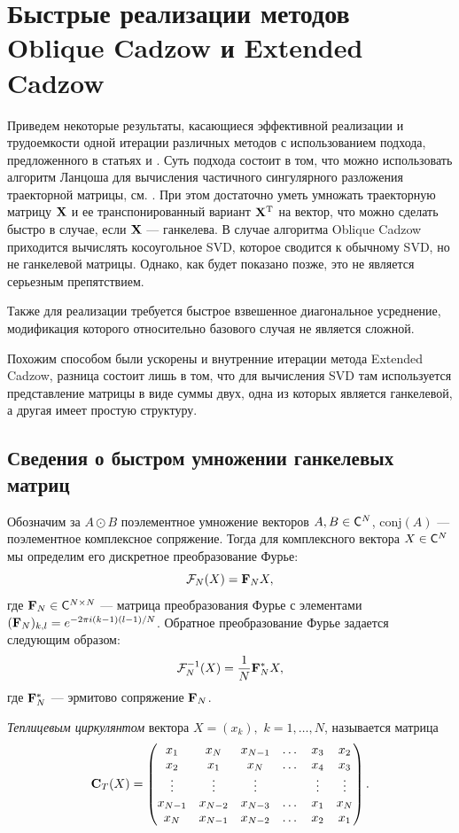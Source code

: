 \documentclass[12pt, specialist, subf,href,colorlinks=true,substylefile = spbu.rtx]{disser}
\theoremstyle{remark}
\theoremstyle{definition}
\begin{document}
\chapter{Быстрые реализации методов Oblique Cadzow и Extended Cadzow}
\label{sec:fast}
Приведем некоторые результаты, касающиеся эффективной реализации и трудоемкости одной итерации различных методов с использованием подхода, предложенного в статьях \cite{Korobeynikov2010} и \cite{Golyandina2013}. Суть подхода состоит в том, что можно использовать алгоритм Ланцоша для вычисления частичного сингулярного разложения траекторной матрицы, см. \cite{Korobeynikov2010}. При этом достаточно уметь умножать траекторную матрицу $\mathbf{X}$ и ее транспонированный вариант $\mathbf{X}^{\mathrm{T}}$ на вектор, что можно сделать быстро в случае, если $\mathbf{X}$ --- ганкелева. В случае алгоритма Oblique Cadzow приходится вычислять косоугольное SVD, которое сводится к обычному SVD, но не ганкелевой матрицы. Однако, как будет показано позже, это не является серьезным препятствием.

Также для реализации требуется быстрое взвешенное диагональное усреднение, модификация которого относительно базового случая не является сложной.

Похожим способом были ускорены и внутренние итерации метода Extended Cadzow, разница состоит лишь в том, что для вычисления SVD там используется представление матрицы в виде суммы двух, одна из которых является ганкелевой, а другая имеет простую структуру.

\section{Сведения о быстром умножении ганкелевых матриц}
Обозначим за $A \odot B$ поэлементное умножение векторов $A, B \in \mathsf{C}^N$, $\text{conj}(A)$ --- поэлементное комплексное сопряжение. Тогда для комплексного вектора $X \in \mathsf{C}^N$ мы определим его дискретное преобразование Фурье:
\begin{equation}\label{Fourier_transform}
\mathcal{F}_N(X) = \mathbf{F}_N X,
\end{equation}
где $\mathbf{F}_N \in \mathsf{C}^{N \times N}$ --- матрица преобразования Фурье с элементами $(\mathbf{F}_N)_{k,l} = e^{-2 \pi i(k-1)(l-1)/N}$. Обратное преобразование Фурье задается следующим образом:
\begin{equation*}
\mathcal{F}^{-1}_N(X) = \frac{1}{N}\mathbf{F}^*_N X,
\end{equation*}
где $\mathbf{F}^*_N$ --- эрмитово сопряжение $\mathbf{F}_N$.

\emph{Теплицевым циркулянтом} вектора $X=(x_k),$ $k = 1, \ldots, N$, называется матрица
\begin{equation*}
\mathbf{C}_T(X) = \begin{pmatrix}
x_1 & x_N & x_{N-1} & \dots & x_3 & x_2 \\ 
x_2 & x_1 & x_N & \dots & x_4 & x_3 \\ 
\vdots & \vdots & \vdots &  & \vdots & \vdots \\ 
x_{N-1} & x_{N-2} & x_{N-3} & \dots & x_1 & x_N \\ 
x_N & x_{N-1} & x_{N-2} & \dots & x_2 & x_1
\end{pmatrix}.
\end{equation*}
\end{document}
